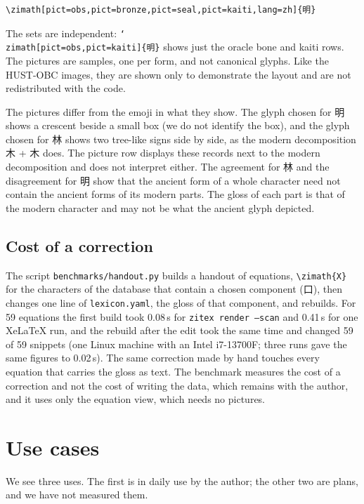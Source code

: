 \documentclass[11pt]{article}
\newcommand{\cmd}[1]{\texttt{\textbackslash #1}}
\begin{document}
\begin{verbatim}
\zimath[pict=obs,pict=bronze,pict=seal,pict=kaiti,lang=zh]{明}
\end{verbatim}


The sets are independent: \texttt{\char`\\zimath[pict=obs,pict=kaiti]\{明\}} shows just the oracle bone and kaiti rows. The pictures are samples, one per
form, and not canonical glyphs. Like the HUST-OBC images, they are shown only to demonstrate the layout and are not redistributed with the code.

\noindent The pictures differ from the emoji in what they show. The glyph chosen for 明 shows a crescent beside a small box (we do not identify the
box), and the glyph chosen for 林 shows two tree-like signs side by side, as the modern decomposition 木 + 木 does. The picture row displays these records
next to the modern decomposition and does not interpret either. The agreement for 林 and the disagreement for 明 show that the ancient form of a whole
character need not contain the ancient forms of its modern parts. The gloss of each part is that of the modern character and may not be what the ancient glyph
depicted.

\subsection{Cost of a correction}
The script \texttt{benchmarks/handout.py} builds a handout of equations, \cmd{zimath}\texttt{\{X\}} for the characters of the database that
contain a chosen component (口), then changes one line of \texttt{lexicon.yaml}, the gloss of that component, and rebuilds. For 59 equations the
first build took 0.08\,s for \texttt{zitex render --scan} and 0.41\,s for one XeLaTeX run, and the rebuild after the edit took the same time and
changed 59 of 59 snippets (one Linux machine with an Intel i7-13700F; three runs gave the same figures to 0.02\,s). The same correction made by hand touches
every equation that carries the gloss as text. The benchmark measures the cost of a correction and not the cost of writing the data, which remains with the
author, and it uses only the equation view, which needs no pictures.

\section{Use cases}\label{sec:uses}
We see three uses. The first is in daily use by the author; the other two are plans, and we have not measured them.
\end{document}
